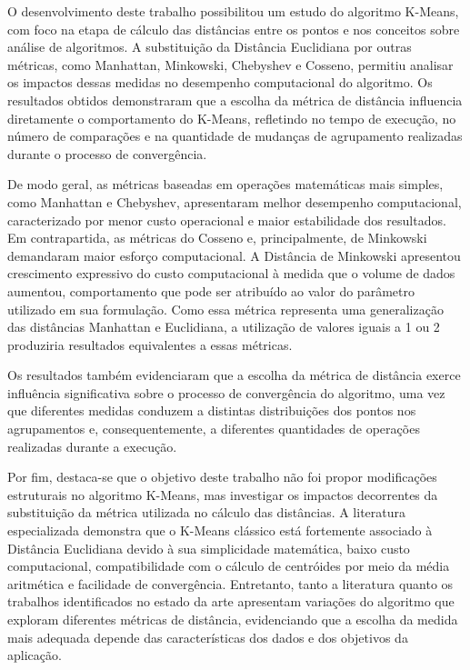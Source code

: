 \documentclass[10pt,a4paper,twocolumn]{article}
\begin{document}

O desenvolvimento deste trabalho possibilitou um estudo do algoritmo K-Means, com foco na etapa de cálculo das distâncias entre os pontos e nos conceitos sobre análise de algoritmos. A substituição da Distância Euclidiana por outras métricas, como Manhattan, Minkowski, Chebyshev e Cosseno, permitiu analisar os impactos dessas medidas no desempenho computacional do algoritmo. Os resultados obtidos demonstraram que a escolha da métrica de distância influencia diretamente o comportamento do K-Means, refletindo no tempo de execução, no número de comparações e na quantidade de mudanças de agrupamento realizadas durante o processo de convergência.

De modo geral, as métricas baseadas em operações matemáticas mais simples, como Manhattan e Chebyshev, apresentaram melhor desempenho computacional, caracterizado por menor custo operacional e maior estabilidade dos resultados. Em contrapartida, as métricas do Cosseno e, principalmente, de Minkowski demandaram maior esforço computacional. A Distância de Minkowski apresentou crescimento expressivo do custo computacional à medida que o volume de dados aumentou, comportamento que pode ser atribuído ao valor do parâmetro utilizado em sua formulação. Como essa métrica representa uma generalização das distâncias Manhattan e Euclidiana, a utilização de valores iguais a 1 ou 2 produziria resultados equivalentes a essas métricas. 

Os resultados também evidenciaram que a escolha da métrica de distância exerce influência significativa sobre o processo de convergência do algoritmo, uma vez que diferentes medidas conduzem a distintas distribuições dos pontos nos agrupamentos e, consequentemente, a diferentes quantidades de operações realizadas durante a execução.

Por fim, destaca-se que o objetivo deste trabalho não foi propor modificações estruturais no algoritmo K-Means, mas investigar os impactos decorrentes da substituição da métrica utilizada no cálculo das distâncias. A literatura especializada demonstra que o K-Means clássico está fortemente associado à Distância Euclidiana devido à sua simplicidade matemática, baixo custo computacional, compatibilidade com o cálculo de centróides por meio da média aritmética e facilidade de convergência. Entretanto, tanto a literatura quanto os trabalhos identificados no estado da arte apresentam variações do algoritmo que exploram diferentes métricas de distância, evidenciando que a escolha da medida mais adequada depende das características dos dados e dos objetivos da aplicação.
\end{document}
